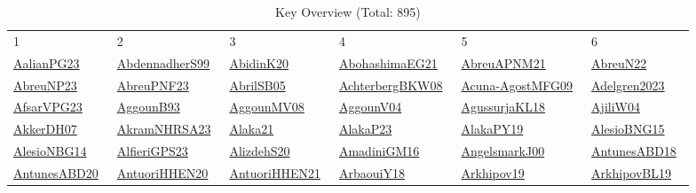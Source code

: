 \begin{longtable}{*{6}{l}}
\rowcolor{white}\caption{Key Overview (Total: 895)}\\ \toprule
\rowcolor{white}1 & 2 & 3 & 4 & 5 & 6\\ \midrule
\endhead
\bottomrule
\endfoot
\href{../works/AalianPG23.pdf}{AalianPG23}~\cite{AalianPG23} & \href{../works/AbdennadherS99.pdf}{AbdennadherS99}~\cite{AbdennadherS99} & \href{../works/AbidinK20.pdf}{AbidinK20}~\cite{AbidinK20} & \href{../works/AbohashimaEG21.pdf}{AbohashimaEG21}~\cite{AbohashimaEG21} & \href{../works/AbreuAPNM21.pdf}{AbreuAPNM21}~\cite{AbreuAPNM21} & \href{../works/AbreuN22.pdf}{AbreuN22}~\cite{AbreuN22}\\ 
\href{../works/AbreuNP23.pdf}{AbreuNP23}~\cite{AbreuNP23} & \href{../works/AbreuPNF23.pdf}{AbreuPNF23}~\cite{AbreuPNF23} & \href{../works/AbrilSB05.pdf}{AbrilSB05}~\cite{AbrilSB05} & \href{../works/AchterbergBKW08.pdf}{AchterbergBKW08}~\cite{AchterbergBKW08} & \href{../works/Acuna-AgostMFG09.pdf}{Acuna-AgostMFG09}~\cite{Acuna-AgostMFG09} & \href{../works/Adelgren2023.pdf}{Adelgren2023}~\cite{Adelgren2023}\\ 
\href{../works/AfsarVPG23.pdf}{AfsarVPG23}~\cite{AfsarVPG23} & \href{../works/AggounB93.pdf}{AggounB93}~\cite{AggounB93} & \href{../}{AggounMV08}~\cite{AggounMV08} & \href{../}{AggounV04}~\cite{AggounV04} & \href{../works/AgussurjaKL18.pdf}{AgussurjaKL18}~\cite{AgussurjaKL18} & \href{../}{AjiliW04}~\cite{AjiliW04}\\ 
\href{../works/AkkerDH07.pdf}{AkkerDH07}~\cite{AkkerDH07} & \href{../works/AkramNHRSA23.pdf}{AkramNHRSA23}~\cite{AkramNHRSA23} & \href{../works/Alaka21.pdf}{Alaka21}~\cite{Alaka21} & \href{../works/AlakaP23.pdf}{AlakaP23}~\cite{AlakaP23} & \href{../works/AlakaPY19.pdf}{AlakaPY19}~\cite{AlakaPY19} & \href{../works/AlesioBNG15.pdf}{AlesioBNG15}~\cite{AlesioBNG15}\\ 
\href{../works/AlesioNBG14.pdf}{AlesioNBG14}~\cite{AlesioNBG14} & \href{../works/AlfieriGPS23.pdf}{AlfieriGPS23}~\cite{AlfieriGPS23} & \href{../}{AlizdehS20}~\cite{AlizdehS20} & \href{../works/AmadiniGM16.pdf}{AmadiniGM16}~\cite{AmadiniGM16} & \href{../works/AngelsmarkJ00.pdf}{AngelsmarkJ00}~\cite{AngelsmarkJ00} & \href{../works/AntunesABD18.pdf}{AntunesABD18}~\cite{AntunesABD18}\\ 
\href{../works/AntunesABD20.pdf}{AntunesABD20}~\cite{AntunesABD20} & \href{../works/AntuoriHHEN20.pdf}{AntuoriHHEN20}~\cite{AntuoriHHEN20} & \href{../works/AntuoriHHEN21.pdf}{AntuoriHHEN21}~\cite{AntuoriHHEN21} & \href{../works/ArbaouiY18.pdf}{ArbaouiY18}~\cite{ArbaouiY18} & \href{../}{Arkhipov19}~\cite{Arkhipov19} & \href{../works/ArkhipovBL19.pdf}{ArkhipovBL19}~\cite{ArkhipovBL19}\\ 

\end{longtable}
